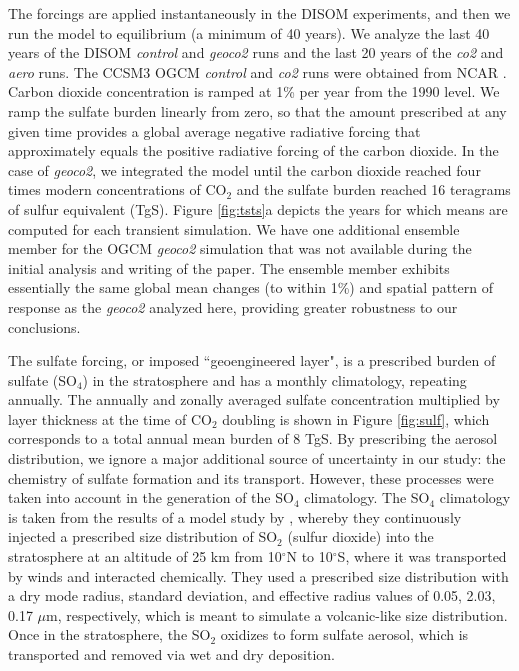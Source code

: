 \documentclass[12pt]{article}
\begin{document}
The forcings are applied instantaneously in the DISOM experiments, and then we run the model to equilibrium (a minimum of 40 years). We analyze the last 40 years of the DISOM \textit{control} and \textit{geoco2} runs and the last 20 years of the \textit{co2} and \textit{aero} runs. The CCSM3 OGCM \textit{control} and \textit{co2} runs were obtained from NCAR \citep{collins06}. Carbon dioxide concentration is ramped at 1\% per year from the 1990 level. We ramp the sulfate burden linearly from zero, so that the amount prescribed at any given time provides a global average negative radiative forcing that approximately equals the positive radiative forcing of the carbon dioxide. In the case of \textit{geoco2}, we integrated the model until the carbon dioxide reached four times modern concentrations of CO$_2$ and the sulfate burden reached 16 teragrams of sulfur equivalent (TgS). Figure \ref{fig:tsts}a depicts the years for which means are computed for each transient simulation. We have one additional ensemble member for the OGCM \textit{geoco2} simulation that was not available during the initial analysis and writing of the paper. The ensemble member exhibits essentially the same global mean changes (to within 1\%) and spatial pattern of response as the \textit{geoco2} analyzed here, providing greater robustness to our conclusions.

The sulfate forcing, or imposed ``geoengineered layer", is a prescribed burden of sulfate (SO$_4$) in the stratosphere and has a monthly climatology, repeating annually. The annually and zonally averaged sulfate concentration multiplied by layer thickness at the time of CO$_2$ doubling is shown in Figure \ref{fig:sulf}, which corresponds to a total annual mean burden of 8 TgS. By prescribing the aerosol distribution, we ignore a major additional source of uncertainty in our study: the chemistry of sulfate formation and its transport. However, these processes were taken into account in the generation of the SO$_4$ climatology. The SO$_4$ climatology is taken from the results of a model study by \cite{rasch08a}, whereby they continuously injected a prescribed size distribution of SO$_2$ (sulfur dioxide) into the stratosphere at an altitude of 25 km from 10$^\circ$N to 10$^\circ$S, where it was transported by winds and interacted chemically. They used a prescribed size distribution with a dry mode radius, standard deviation, and effective radius values of 0.05, 2.03, 0.17 $\mu$m, respectively, which is meant to simulate a volcanic-like size distribution. Once in the stratosphere, the SO$_2$ oxidizes to form sulfate aerosol, which is transported and removed via wet and dry deposition. 
\end{document}

